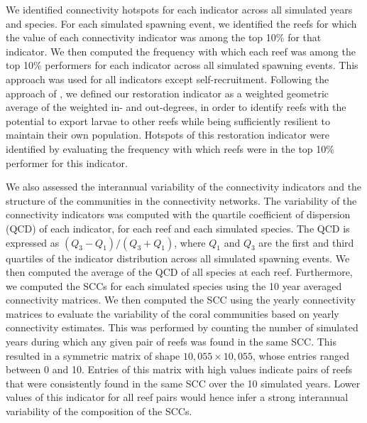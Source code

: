 \documentclass[preprint,12pt,authoryear]{elsarticle}
\begin{document}
	We identified connectivity hotspots for each indicator across all simulated years and species. For each simulated spawning event, we identified the reefs for which the value of each connectivity indicator was among the top 10\% for that indicator. We then computed the frequency with which each reef was among the top 10\% performers for each indicator across all simulated spawning events. This approach was used for all indicators except self-recruitment. Following the approach of \cite{tnc2024}, we defined our restoration indicator as a weighted geometric average of the weighted in- and out-degrees, in order to identify reefs with the potential to export larvae to other reefs while being sufficiently resilient to maintain their own population. Hotspots of this restoration indicator were identified by evaluating the frequency with which reefs were in the top 10\% performer for this indicator.
	
	We also assessed the interannual variability of the connectivity indicators and the structure of the communities in the connectivity networks. The variability of the connectivity indicators was computed with the quartile coefficient of dispersion (QCD) of each indicator, for each reef and each simulated species. The QCD is expressed as $(Q_3-Q_1) / (Q_3+Q_1)$, where $Q_1$ and $Q_3$ are the first and third quartiles of the indicator distribution across all simulated spawning events. We then computed the average of the QCD of all species at each reef. Furthermore, we computed the SCCs for each simulated species using the 10 year averaged connectivity matrices. We then computed the SCC using the yearly connectivity matrices to evaluate the variability of the coral communities based on yearly connectivity estimates. This was performed by counting the number of simulated years during which any given pair of reefs was found in the same SCC. This resulted in a symmetric matrix of shape $10,055 \times 10,055$, whose entries ranged between 0 and 10. Entries of this matrix with high values indicate pairs of reefs that were consistently found in the same SCC over the 10 simulated years. Lower values of this indicator for all reef pairs would hence infer a strong interannual variability of the composition of the SCCs.
	
\end{document}
